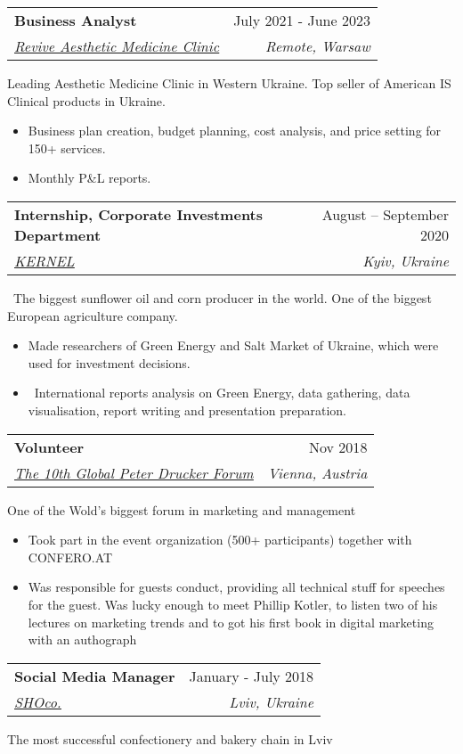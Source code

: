 \documentclass[letterpaper,11pt]{article}
\makeatletter
\newcommand{\resumeItem}[1]{
  \item\small{
    {#1 \vspace{-2pt}}
  }
}
\newcommand{\resumePositionSummary}[1]{
  \item\small{
    {#1 \vspace{-8pt}}
  }
}
\newcommand{\resumeSubheading}[4]{
  \vspace{-2pt}\item
    \begin{tabular*}{0.97\textwidth}[t]{l@{\extracolsep{\fill}}r}
      \textbf{#1} & #2 \\
      \textit{\small#3} & \textit{\small #4} \\
    \end{tabular*}\vspace{-7pt}
}
\newcommand{\resumeItemListStart}{\begin{itemize}}
\newcommand{\resumeItemListEnd}{\end{itemize}\vspace{-5pt}}
\makeatother
\begin{document}
    \resumeSubheading
      {Business Analyst}{July 2021 - June 2023}
      {\href{https://revive-aesthetic-medicine-clinic.business.site/}{\underline{Revive Aesthetic Medicine Clinic}}}{Remote, Warsaw}

      \resumePositionSummary{Leading Aesthetic Medicine Clinic in Western Ukraine. Top seller of American IS Clinical products in Ukraine.}

      \resumeItemListStart
        \resumeItem{Business plan creation, budget planning, cost analysis, and price setting for 150+ services. }
        \resumeItem{Monthly P\&L reports.} 
      
      \resumeItemListEnd

    \resumeSubheading
      {Internship, Corporate Investments Department}{August -- September 2020}
      {\href{https://www.kernel.ua}{\underline{KERNEL}}} {Kyiv, Ukraine}
      \resumePositionSummary{\ The biggest sunflower oil and corn producer in the world. One of the biggest European agriculture company. }
     
      
      \resumeItemListStart
        \resumeItem{Made researchers of Green Energy and Salt Market of Ukraine, which were used for investment decisions.}
        \resumeItem  {\ International reports analysis on Green Energy, data gathering, data visualisation, report writing and presentation preparation. }
        
      \resumeItemListEnd

    \resumeSubheading
      {Volunteer}{Nov 2018}
      {\href{https://www.druckerforum.org/home/}{\underline{The 10th Global Peter Drucker Forum}}} {Vienna, Austria}
      
      \resumePositionSummary {One of the Wold's biggest forum in marketing and management}
      
      \resumeItemListStart
        \resumeItem {Took part in the event organization (500+ participants) together with CONFERO.AT}
        \resumeItem{Was responsible for guests conduct, providing all technical stuff for speeches for the guest. Was lucky enough to meet Phillip Kotler, to listen two of his lectures on marketing trends and to got his first book in digital marketing with an authograph }
      \resumeItemListEnd

    \resumeSubheading
      {Social Media Manager}{January - July 2018}
      {\href{https://www.shoco.ua}{\underline{SHOco.}}} {Lviv, Ukraine}
      \resumePositionSummary { The most successful confectionery and bakery chain in Lviv }
      
\end{document}
